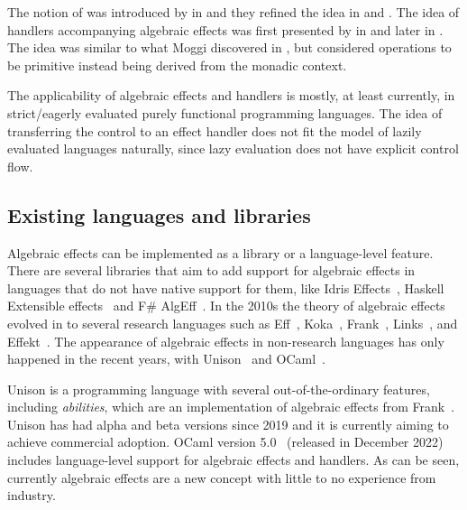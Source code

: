The notion of  was introduced by \textcite{adequacy-for-alg-effs} in \citeyear{adequacy-for-alg-effs} and they refined the idea in \cite{comp-effs-and-ops} and \cite{alg-ops-gen-effs}. The idea of handlers accompanying algebraic effects was first presented by \textcite{handlers-of-alg-effs} in \citeyear{handlers-of-alg-effs} and later \textcite{handling-alg-effs} in \citeyear{handling-alg-effs}. The idea was similar to what Moggi discovered in \cite{notions-computations}, but \citeauthor{adequacy-for-alg-effs} considered operations to be primitive instead being derived from the monadic context.

The applicability of algebraic effects and handlers is mostly, at least currently, in strict/eagerly evaluated purely functional programming languages. The idea of transferring the control to an effect handler does not fit the model of lazily evaluated languages naturally, since lazy evaluation does not have explicit control flow.~\cite{alg-effs-for-fp}


\subsection{Existing languages and libraries}
Algebraic effects can be implemented as a library or a language-level feature. There are several libraries that aim to add support for algebraic effects in languages that do not have native support for them, like Idris Effects~\cite{idris-effects}, Haskell Extensible effects~\cite{extensible-effects} and F\# AlgEff~\cite{fsharp-alg-eff}. In the 2010s the theory of algebraic effects evolved in to several research languages such as Eff~\cite{eff-lang}, Koka~\cite{koka-lang}, Frank~\cite{frank-lang}, Links~\cite{links-lang}, and Effekt~\cite{effekt-lang}. The appearance of algebraic effects in non-research languages has only happened in the recent years, with Unison~\cite{unison-lang} and OCaml~\cite{ocaml-lang}.

Unison is a programming language with several out-of-the-ordinary features, including \emph{abilities}, which are an implementation of algebraic effects from Frank~\cite{frank-lang}. Unison has had alpha and beta versions since 2019 and it is currently aiming to achieve commercial adoption. OCaml version 5.0~\cite{ocaml-v5} (released in December 2022) includes language-level support for algebraic effects and handlers. As can be seen, currently algebraic effects are a new concept with little to no experience from industry.


